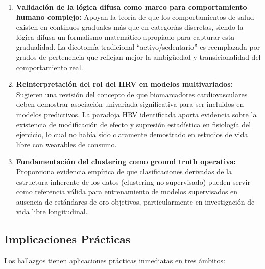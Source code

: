 \begin{enumerate}
    \item \textbf{Validación de la lógica difusa como marco para comportamiento humano complejo:} Apoyan la teoría de que los comportamientos de salud existen en continuos graduales más que en categorías discretas, siendo la lógica difusa un formalismo matemático apropiado para capturar esta gradualidad. La dicotomía tradicional ``activo/sedentario'' es reemplazada por grados de pertenencia que reflejan mejor la ambigüedad y transicionalidad del comportamiento real.
    
    \item \textbf{Reinterpretación del rol del HRV en modelos multivariados:} Sugieren una revisión del concepto de que biomarcadores cardiovasculares deben demostrar asociación univariada significativa para ser incluidos en modelos predictivos. La paradoja HRV identificada aporta evidencia sobre la existencia de modificación de efecto y supresión estadística en fisiología del ejercicio, lo cual no había sido claramente demostrado en estudios de vida libre con wearables de consumo.
    
    \item \textbf{Fundamentación del clustering como ground truth operativa:} Proporciona evidencia empírica de que clasificaciones derivadas de la estructura inherente de los datos (clustering no supervisado) pueden servir como referencia válida para entrenamiento de modelos supervisados en ausencia de estándares de oro objetivos, particularmente en investigación de vida libre longitudinal.
\end{enumerate}

\subsection{Implicaciones Prácticas}
\label{subsec:implicaciones_practicas}

Los hallazgos tienen aplicaciones prácticas inmediatas en tres ámbitos:

